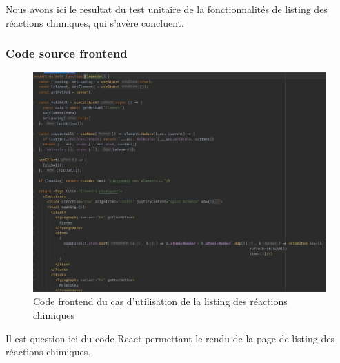 Nous avons ici le resultat du test unitaire de la fonctionnalités de listing des réactions chimiques, qui s'avère concluent.

\subsubsection{Code source frontend}

\begin{figure}[H]
	\centering
	\includegraphics[width=1\textwidth]{img/frl}
	\caption{Code frontend du cas d'utilisation de la listing des réactions chimiques}
\end{figure}

Il est question ici du code React permettant le rendu de la page de listing des réactions chimiques.
